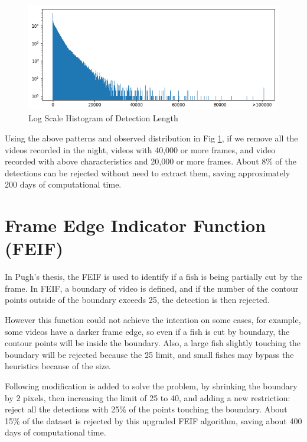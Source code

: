 \documentclass[bsc,logo,twoside,fullspacing,parskip]{infthesis}
\begin{document}
\begin{figure}[h]
\centering
    \includegraphics[scale=0.40]{graph/frame_distribution.png}
    \caption{Log Scale Histogram of Detection Length}
    \label{fig:vidlength}
\end{figure}

Using the above patterns and observed distribution in Fig \ref{fig:vidlength}, if we remove all the videos recorded in the night, videos with 40,000 or more frames, and video recorded with above characteristics and 20,000 or more frames. About 8\% of the detections can be rejected without need to extract them, saving approximately 200 days of computational time.


\section{Frame Edge Indicator Function (FEIF)}

In Pugh's thesis\cite{P1}, the FEIF is used to identify if a fish is being partially cut by the frame. In FEIF, a boundary of video is defined, and if the number of the contour points outside of the boundary exceeds 25, the detection is then rejected.

However this function could not achieve the intention on some cases, for example, some videos have a darker frame edge, so even if a fish is cut by boundary, the contour points will be inside the boundary. Also, a large fish slightly touching the boundary will be rejected because the 25 limit, and small fishes may bypass the heuristics because of the size.

Following modification is added to solve the problem, by shrinking the boundary by 2 pixels, then increasing the limit of 25 to 40, and adding a new restriction: reject all the detections with 25\% of the points touching the boundary. About 15\% of the dataset is rejected by this upgraded FEIF algorithm, saving about 400 days of computational time.
\end{document}
